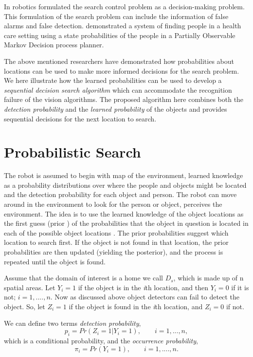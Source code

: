 In robotics \cite{chung2007decision} formulated the search control problem as a decision-making problem. This formulation of the search problem can include the information of false alarms and false detection. \cite{roy2003planning} demonstrated a system of finding people in a health care setting using a state probabilities of the people in a Partially Observable Markov Decision process planner. 

The above mentioned researchers have demonstrated how probabilities about locations can be used to make more informed decisions for the search problem. We here illustrate how the learned probabilities can be used to develop a \emph{sequential decision search algorithm} which can accommodate the recognition failure of the vision algorithms. The proposed algorithm here combines both the \emph{detection probability} and the \emph{learned probability} of the objects and provides sequential decisions for the next location to search.

\section{Probabilistic Search}

The robot is assumed to begin with map of the environment, learned knowledge as a probability distributions over where the people and objects might be located and the detection probability for each object and person. The robot can move around in the environment to look for the person or object, perceives the environment. 
The idea is to use the learned knowledge of the object locations as the first guess (prior ) of the probabilities that the object in question is located in each of the possible object locations \cite{cressie2015statistics}. The prior probabilities suggest which location to search first. If the object is not found in that location, the prior probabilities are then updated (yielding the posterior), and the process is repeated until the object is found. 

Assume that the domain of interest is a home we call $D_s$, which is made up of n spatial areas. Let $Y_i = 1$ if the object is in the \emph{i}th location, and then $Y_i = 0$ if it is not; $ i = 1, .... , n$. Now as discussed above object detectors can fail to detect the object. So, let $Z_i = 1$ if the object is found in the \emph{i}th location, and $Z_i = 0$ if not.

We can define two terms \emph{detection probability},
\begin{equation}
	p_i = Pr(Z_i = 1| Y_i =1), \qquad  i = 1,...,n,
\end{equation}
which is a conditional probability, and the \emph{occurrence probability},
\begin{equation}
	\pi_i = Pr(Y_i = 1),\qquad  i = 1, .... , n.
\end{equation}

